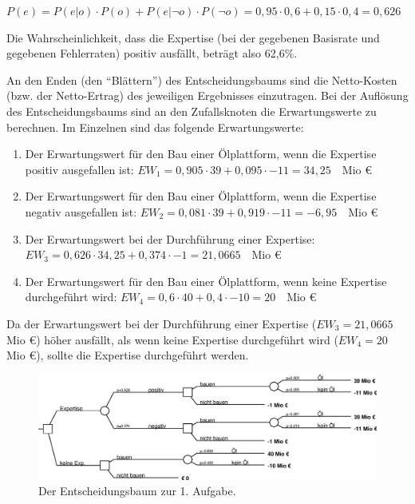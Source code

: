 \documentclass[10pt, a4paper, german]{article}
\numberwithin {equation}{section}
\begin{document}
\vspace{0.2cm}
$P(e) = P(e|o)\cdot P(o) + P(e|\neg o)\cdot P(\neg o) = 
0,95\cdot 0,6 + 0,15\cdot 0,4 = 0,626$

\vspace{0.2cm}
Die Wahrscheinlichkeit, dass die Expertise (bei der gegebenen Basisrate und
gegebenen Fehlerraten) positiv ausfällt, beträgt also 62,6\%.

\vspace{0.2cm}
An den Enden (den ``Blättern'') des Entscheidungsbaums sind die Netto-Kosten
(bzw. der Netto-Ertrag) des jeweiligen Ergebnisses einzutragen. Bei der
Auflösung des Entscheidungsbaums sind an den Zufallsknoten die 
Erwartungswerte zu berechnen. Im Einzelnen sind das folgende Erwartungswerte:

\begin{enumerate}

\item Der Erwartungswert für den Bau einer Ölplattform, wenn die
  Expertise positiv ausgefallen ist:
  $EW_1 = 0,905\cdot 39 + 0,095\cdot -11 = 34,25 \quad \mbox{Mio €}$

\item Der Erwartungswert für den Bau einer Ölplattform, wenn die
  Expertise negativ ausgefallen ist:
  $EW_2 = 0,081\cdot 39 + 0,919\cdot -11 = -6,95 \quad \mbox{Mio €}$

\item Der Erwartungswert bei der Durchführung einer Expertise:\\
  $EW_3 = 0,626\cdot 34,25 + 0,374\cdot -1 = 21,0665 \quad \mbox{Mio €}$

\item Der Erwartungswert für den Bau einer Ölplattform, wenn keine
  Expertise durchgeführt wird:
  $EW_4 = 0,6\cdot 40 + 0,4\cdot -10 = 20 \quad \mbox{Mio €}$

\end{enumerate}

Da der Erwartungswert bei der Durchführung einer Expertise ($EW_3 =
21,0665$ Mio €) höher ausfällt, als wenn keine Expertise durchgeführt
wird ($EW_4 = 20$ Mio €), sollte die Expertise durchgeführt werden.


\begin{figure}
\begin{center}
\includegraphics[width=22cm]{Grafiken/Klausur_2009.eps}
\caption{Der Entscheidungsbaum zur 1. Aufgabe.}
\end{center}
\end{figure}
\end{document}
